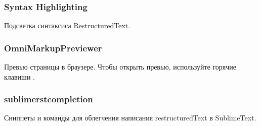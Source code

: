 \documentclass[letterpaper,12pt,russian]{sphinxmanual}
\begin{document}
\subsubsection{Syntax Highlighting}
\label{\detokenize{editor:syntax-highlighting}}
Подсветка синтаксиса RestructuredText.



\subsubsection{OmniMarkupPreviewer}
\label{\detokenize{editor:omnimarkuppreviewer}}
Превью страницы в браузере. Чтобы открыть превью, используйте горячие клавиши .



\subsubsection{sublime\sphinxhyphen{}rst\sphinxhyphen{}completion}
\label{\detokenize{editor:sublime-rst-completion}}
Сниппеты и команды для облегчения написания restructuredText в SublimeText.
\end{document}
